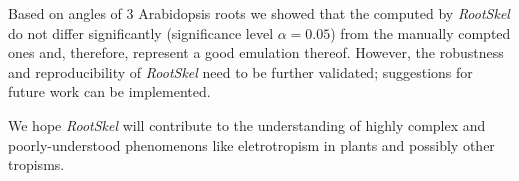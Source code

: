 Based on angles of 3 Arabidopsis roots we showed that the computed by \textit{RootSkel} do not differ significantly (significance level \(\alpha = 0.05\)) from the manually compted ones and, therefore, represent a good emulation thereof.
However, the robustness and reproducibility of \textit{RootSkel} need to be further validated; suggestions for future work can be implemented. 

We hope \textit{RootSkel} will contribute to the understanding of highly complex and poorly-understood phenomenons like eletrotropism in plants and possibly other tropisms. %

%



